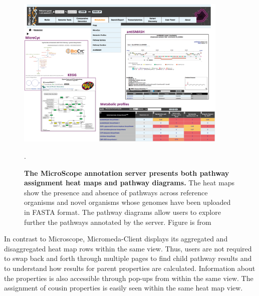\begin{figure}[!ht]
  \centering
	\includegraphics[width=0.9\textwidth]{media/microscope.png}
	 \caption[The MicroScope annotation server presents both pathway assignment heat maps and pathway diagrams.]{\textbf{The MicroScope annotation server presents both pathway assignment heat maps and pathway diagrams.} The heat maps show the presence and absence of pathways across reference organisms and novel organisms whose genomes have been uploaded in FASTA format. The pathway diagrams allow users to explore further the pathways annotated by the server. Figure is from \cite{vallenet2016microscope}}.
	 \label{fig:microscope}
\end{figure}

In contrast to Microscope, Micromeda-Client displays its aggregated and disaggregated heat map rows within the same view. Thus, users are not required to swap back and forth through multiple pages to find child pathway results and to understand how results for parent properties are calculated. Information about the properties is also accessible through pop-ups from within the same view. The assignment of cousin properties is easily seen within the same heat map view.

